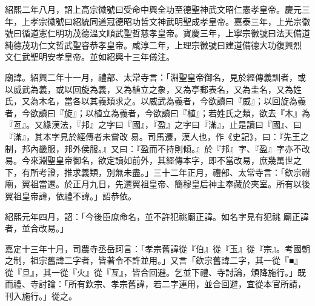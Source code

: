 \begin{pinyinscope}
 紹熙二年八月，詔上高宗徽號曰受命中興全功至德聖神武文昭仁憲孝皇帝。慶元三年，上孝宗徽號曰紹統同道冠德昭功哲文神武明聖成孝皇帝。嘉泰三年，上光宗徽號曰循道憲仁明功茂德溫文順武聖哲慈孝皇帝。寶慶三年，上寧宗徽號曰法天備道純德茂功仁文哲武聖睿恭孝皇帝。咸淳二年，上理宗徽號曰建道備德大功復興烈
 文仁武聖明安孝皇帝。並如紹興十三年儀注。



 廟諱。紹興二年十一月，禮部、太常寺言：「淵聖皇帝御名，見於經傳義訓者，或以威武為義，或以回旋為義，又為植立之象，又為亭郵表名，又為圭名，又為姓氏，又為木名，當各以其義類求之。以威武為義者，今欲讀曰『威』；以回旋為義者，今欲讀曰『旋』；以植立為義者，今欲讀曰『植』；若姓氏之類，欲去『木』為『亙』。又緣漢法，『邦』之字曰『國』，『盈』之字曰『滿』，止是讀曰『國』、曰『滿』，其本字見於經傳者未嘗改
 易。司馬遷，漢人也，作《史記》，曰：『先王之制，邦內畿服，邦外侯服。』又曰：『盈而不持則傾。』於『邦』字、『盈』字亦不改易。今來淵聖皇帝御名，欲定讀如前外，其經傳本字，即不當改易，庶幾萬世之下，有所考證，推求義類，別無未盡。」三十二年正月，禮部、太常寺言：「欽宗祔廟，翼祖當遷。於正月九日，先遷翼祖皇帝、簡穆皇后神主奉藏於夾室。所有以後翼祖皇帝諱，依禮不諱。」詔恭依。



 紹熙元年四月，詔：「今後臣庶命名，並不許犯祧廟正諱。如名字見有犯祧
 廟正諱者，並合改易。」



 嘉定十三年十月，司農寺丞岳珂言：「孝宗舊諱從『伯』從『玉』從『宗』。考國朝之制，祖宗舊諱二字者，皆著令不許並用。」又言「欽宗舊諱二字，其一從『■』從『旦』，其一從『火』從『亙』，皆合回避。乞並下禮、寺討論，頒降施行。」既而禮、寺討論：「所有欽宗、孝宗舊諱，若二字連用，並合回避，宜從本官所請，刊入施行。」從之。



\end{pinyinscope}